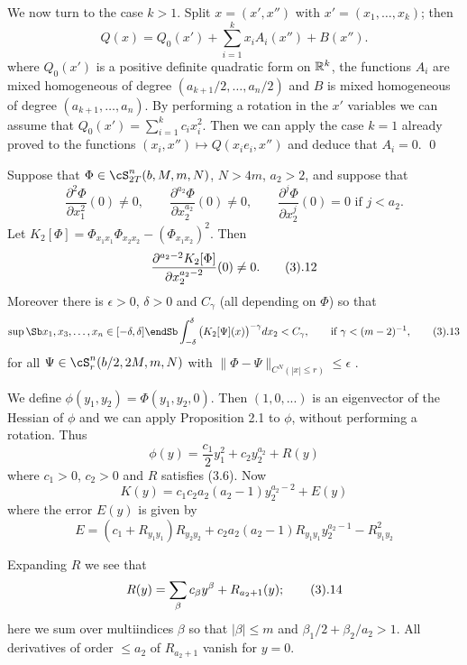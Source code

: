 We now turn to the case $k>1$. Split $x=(x',x'')$ with $x'=(x_1,\dots, x_k)$;
then
$$
Q(x)=Q_0(x')+\sum_{i=1}^k x_i A_i(x'')+B(x'').
$$
where $Q_0(x')$  is a positive definite quadratic form on $\Bbb R^{k}$, 
the functions $A_i$ are mixed homogeneous of degree
$(a_{k+1}/2,\dots, a_{n}/2)$ and $B$ is mixed homogeneous of degree
$(a_{k+1},\dots, a_{n})$. By performing a rotation in the $x'$ variables we 
can assume that $Q_0(x')=\sum_{i=1}^k c_ix_i^2$. Then we can apply  
the case $k=1$  already proved
to the functions
$(x_i,x'')\mapsto Q(x_ie_i,x'')$ and deduce that $A_i=0$.
\qed
\enddemo






 Suppose that 
$\Phi\in \cS^n_{2T}(b,M,m,N)$, $N>4m$, $a_2>2$,  and suppose that
$$
\frac{\partial^2\Phi}{\partial x_1^2}(0)\neq 0,
\qquad
\frac{\partial^{a_2}\Phi}{\partial x_2^{a_2}}(0)\neq 0,
\qquad
\frac{\partial^j\Phi}{\partial x_2^j}(0)= 0 \text{ if } j<a_2.
$$
Let $K_2[\Phi]=\Phi_{x_1x_1}\Phi_{x_2x_2}-(\Phi_{x_1x_2})^2$.
Then
$$
\frac{\partial^{a_2-2} K_2[\Phi]}{\partial x_2^{a_2-2}}(0)\neq 0.
\tag 3.12$$
Moreover there is $\epsilon>0$, $\delta>0$ and $C_\gamma$ (all depending on 
$\Phi$) so that 
$$
\sup\Sb
x_1,x_3,\dots, x_n\\ \in [-\delta,\delta]
\endSb
\int_{-\delta}^\delta\big(K_2[\Psi](x)\big)^{-\gamma} dx_2<C_\gamma, 
\qquad\text{if }  \gamma<(m-2)^{-1},
\tag 3.13
$$ 
for all
$\Psi\in\cS^n_{r}(b/2, 2M,m,N)$ with 
$\|\Phi-\Psi\|_{C^N(|x|\le r)}\le \epsilon$ .

\endproclaim
{}
We define $\phi(y_1,y_2)=\Phi(y_1,y_2,0)$. Then $(1,0,...)$
 is an eigenvector
 of the Hessian of $\phi$ and we can apply Proposition 2.1
 to $\phi$, without performing a rotation. Thus
$$\phi(y)=\frac{c_1}2 y_1^2 +c_2 y_2^{a_2}+R(y)
$$
where $c_1>0$, $c_2>0$ and  $R$ satisfies (3.6). 
Now
$$
K(y)=
c_1c_2 a_2(a_2-1) y_2^{a_2-2}+E(y)$$ where the error $E(y)$ is given by
$$E=(c_1+R_{y_1y_1})R_{y_2y_2}+
c_2a_2(a_2-1)R_{y_1y_1}y_2^{a_2-1}-
R_{y_1y_2}^2
$$

Expanding $R$ we see that
$$
R(y)=\sum_\beta c_\beta y^\beta+R_{a_2+1}(y);
\tag 3.14
$$
here we sum over multiindices $\beta$  so that $|\beta|\le m$ and
$ \beta_1/2+\beta_2/a_2>1$.
All derivatives of order
 $\le a_2$  of $R_{a_2+1}$
vanish for $y=0$.

